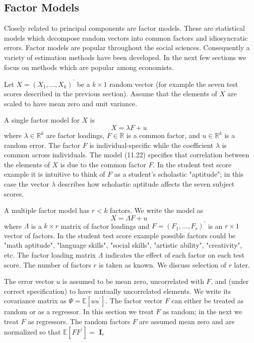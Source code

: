 \documentclass[10pt]{article}
\begin{document}
\subsection{Factor Models}
Closely related to principal components are factor models. These are statistical models which decompose random vectors into common factors and idiosyncratic errors. Factor models are popular throughout the social sciences. Consequently a variety of estimation methods have been developed. In the next few sections we focus on methods which are popular among economists.

Let $X=\left(X_{1}, \ldots, X_{k}\right)^{\prime}$ be a $k \times 1$ random vector (for example the seven test scores described in the previous section). Assume that the elements of $X$ are scaled to have mean zero and unit variance.

A single factor model for $X$ is
$$
X=\lambda F+u
$$
where $\lambda \in \mathbb{R}^{k}$ are factor loadings, $F \in \mathbb{R}$ is a common factor, and $u \in \mathbb{R}^{k}$ is a random error. The factor $F$ is individual-specific while the coefficient $\lambda$ is common across individuals. The model (11.22) specifies that correlation between the elements of $X$ is due to the common factor $F$. In the student test score example it is intuitive to think of $F$ as a student's scholastic "aptitude"; in this case the vector $\lambda$ describes how scholastic aptitude affects the seven subject scores.

A multiple factor model has $r<k$ factors. We write the model as
$$
X=\Lambda F+u
$$
where $\Lambda$ is a $k \times r$ matrix of factor loadings and $F=\left(F_{1}, \ldots, F_{r}\right)^{\prime}$ is an $r \times 1$ vector of factors. In the student test score example possible factors could be "math aptitude", "language skills", "social skills", "artistic ability", "creativity", etc. The factor loading matrix $\Lambda$ indicates the effect of each factor on each test score. The number of factors $r$ is taken as known. We discuss selection of $r$ later.

The error vector $u$ is assumed to be mean zero, uncorrelated with $F$, and (under correct specification) to have mutually uncorrelated elements. We write its covariance matrix as $\Psi=\mathbb{E}\left[u u^{\prime}\right]$. The factor vector $F$ can either be treated as random or as a regressor. In this section we treat $F$ as random; in the next we treat $F$ as regressors. The random factors $F$ are assumed mean zero and are normalized so that $\mathbb{E}\left[F F^{\prime}\right]=$ $\boldsymbol{I}_{r}$
\end{document}
